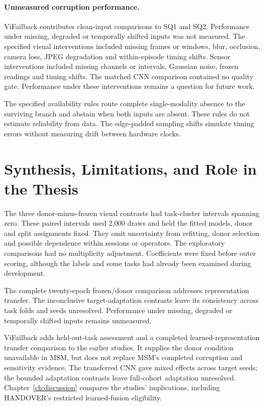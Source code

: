 \paragraph{Unmeasured corruption performance.}
ViFailback contributes clean-input comparisons to SQ1 and SQ2. Performance under missing,
degraded or temporally shifted inputs was not measured. The specified visual interventions
included missing frames or windows, blur, occlusion, camera loss, JPEG degradation and
within-episode timing shifts. Sensor interventions included missing channels or
intervals, Gaussian noise, frozen readings and timing shifts. The matched CNN comparison
contained no quality gate. Performance under these interventions remains a question for
future work.

The specified availability rules route complete single-modality absence to the surviving
branch and abstain when both inputs are absent. These rules do not estimate reliability
from data. The edge-padded sampling shifts simulate timing errors without measuring
drift between hardware clocks.


\section{Synthesis, Limitations, and Role in the Thesis}
The three donor-minus-frozen visual contrasts had task-cluster intervals spanning zero.
These paired intervals used 2,000 draws and held the fitted models, donor and split
assignments fixed. They omit uncertainty from refitting, donor selection and possible
dependence within sessions or operators. The exploratory comparisons had no multiplicity
adjustment. Coefficients were fixed before outer scoring, although the labels and some
tasks had already been examined during development.

The complete twenty-epoch frozen/donor comparison addresses representation transfer. The
inconclusive target-adaptation contrasts leave its consistency across task folds and
seeds unresolved. Performance under missing, degraded or temporally shifted inputs
remains unmeasured.

ViFailback adds held-out-task assessment and a completed learned-representation
transfer comparison to the earlier studies. It supplies the donor condition unavailable
in MSM, but does not replace MSM's completed corruption and sensitivity evidence.
The transferred CNN gave mixed effects across target seeds; the bounded adaptation
contrasts leave full-cohort adaptation unresolved. Chapter~\ref{ch:discussion} compares
the studies' implications, including HANDOVER's restricted learned-fusion eligibility.
